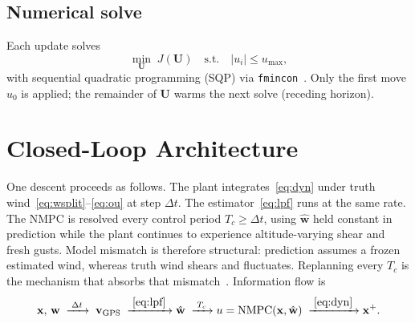 \documentclass[conference]{IEEEtran}
\begin{document}
\subsection{Numerical solve}

Each update solves
\begin{equation}
\min_{\mathbf{U}}\; J(\mathbf{U})
\quad\text{s.t.}\quad
|u_i|\le u_{\max},
\label{eq:nlp}
\end{equation}
with sequential quadratic programming (SQP) via \texttt{fmincon}~\cite{NocedalWright2006,Rawlings2017}.
Only the first move $u_0$ is applied; the remainder of $\mathbf{U}$ warms the next solve (receding horizon).

\section{Closed-Loop Architecture}

One descent proceeds as follows.
The plant integrates~\eqref{eq:dyn} under truth wind~\eqref{eq:wsplit}--\eqref{eq:ou} at step $\Delta t$.
The estimator~\eqref{eq:lpf} runs at the same rate.
The NMPC is resolved every control period $T_c\ge\Delta t$, using $\hat{\mathbf{w}}$ held constant in prediction while the plant continues to experience altitude-varying shear and fresh gusts.
Model mismatch is therefore structural: prediction assumes a frozen estimated wind, whereas truth wind shears and fluctuates.
Replanning every $T_c$ is the mechanism that absorbs that mismatch~\cite{Rawlings2017}.
Information flow is
\begin{equation}
\mathbf{x},\,\mathbf{w}
\;\xrightarrow{\;\Delta t\;}\;
\mathbf{v}_{\mathrm{GPS}}
\;\xrightarrow{\;\eqref{eq:lpf}\;}
\hat{\mathbf{w}}
\;\xrightarrow{\;T_c\;}
u=\mathrm{NMPC}(\mathbf{x},\hat{\mathbf{w}})
\;\xrightarrow{\;\eqref{eq:dyn}\;}
\mathbf{x}^+.
\label{eq:loop}
\end{equation}
\end{document}
